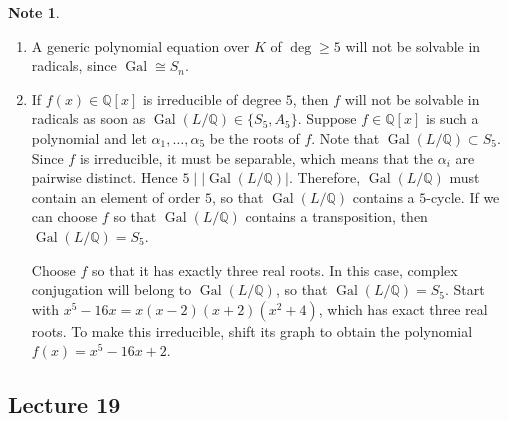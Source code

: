 \documentclass[10pt,letterpaper,cm]{nupset}
\theoremstyle{definition}
\newtheorem{note}[definition]{Note}
\theoremstyle{theorem}
\theoremstyle{remark}
\newcommand{\Q}{\mathbb Q}
\newcommand{\1}{\mathbf{1}}
\newcommand{\0}{\vec 0}
\DeclareMathOperator{\gal}{Gal}
\begin{document}
\begin{note} $ $
\begin{enumerate}
\item A generic polynomial equation over $K$ of $\deg \geq 5$ will not be solvable in radicals, since $\gal \cong S_n$.
\item If $f(x) \in \Q[x]$ is irreducible of degree $5$, then $f$ will not be solvable in radicals as soon as $\gal(L/\Q) \in \{S_5, A_5\}$. Suppose $f \in \Q[x]$ is such a polynomial and let $\alpha_1, \ldots, \alpha_5$ be the roots of $f$. Note that $\gal(L/\Q) \subset S_5$. Since  $f$ is irreducible, it must be separable, which means that the $\alpha_i$ are pairwise distinct. Hence $5 \mid |\gal(L/\Q)|$. Therefore, $\gal(L/\Q)$ must contain an element of order $5$, so that $\gal(L/\Q)$ contains a $5$-cycle. If we can choose $f$ so that $\gal(L/\Q)$ contains a transposition, then $\gal(L/\Q) = S_5$.  

Choose $f$ so that it has exactly three real roots. In this case, complex conjugation will belong to $\gal(L/\Q)$, so that $\gal(L/\Q) = S_5$. Start with $x^5-16x = x(x-2)(x+2)(x^2 +4)$, which has exact three real roots. To make this irreducible, shift its graph to obtain the polynomial $f(x) = x^5 -16x +2$.
\end{enumerate}
\end{note}

\subsection{Lecture 19}
\end{document}
